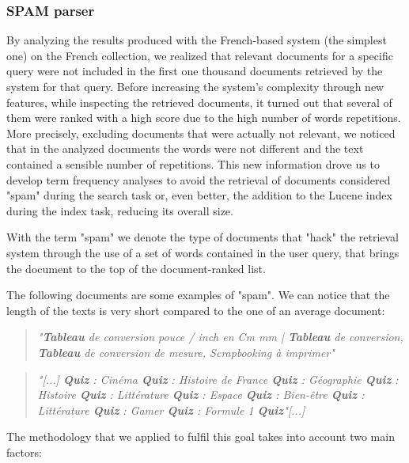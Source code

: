\subsubsection{SPAM parser}
\label{subsubsec:spam}
By analyzing the results produced with the French-based system (the simplest one) on the French collection, we realized that relevant documents for a specific query were not included in the first one thousand documents retrieved by the system for that query. Before increasing the system's complexity through new features, while inspecting the retrieved documents, it turned out that several of them were ranked with a high score due to the high number of words repetitions. More precisely, excluding documents that were actually not relevant, we noticed that in the analyzed documents the words were not different and the text contained a sensible number of repetitions. This new information drove us to develop term frequency analyses to avoid the retrieval of documents considered "spam" during the search task or, even better, the addition to the Lucene index during the index task, reducing its overall size.  
\par
With the term "spam" we denote the type of documents that "hack" the retrieval system through the use of a set of words contained in the user query, that brings the document to the top of the document-ranked list.   
\par
The following documents are some examples of "spam". We can notice that the length of the texts is very short compared to the one of an average document: 
\begin{quote}
    \centering \textit{"\textbf{Tableau} de conversion pouce / inch en Cm mm | \textbf{Tableau} de conversion, \textbf{Tableau} de conversion de mesure, Scrapbooking à imprimer"} 
\end{quote}
\begin{quote}
    \centering  \textit{"[...] \textbf{Quiz} : Cinéma \textbf{Quiz} : Histoire de France \textbf{Quiz} : Géographie \textbf{Quiz} : Histoire \textbf{Quiz} : Littérature \textbf{Quiz} : Espace \textbf{Quiz} : Bien-être \textbf{Quiz} : Littérature \textbf{Quiz} : Gamer \textbf{Quiz} : Formule 1 \textbf{Quiz}"[...] }
\end{quote}
The methodology that we applied to fulfil this goal takes into account two main factors:  
